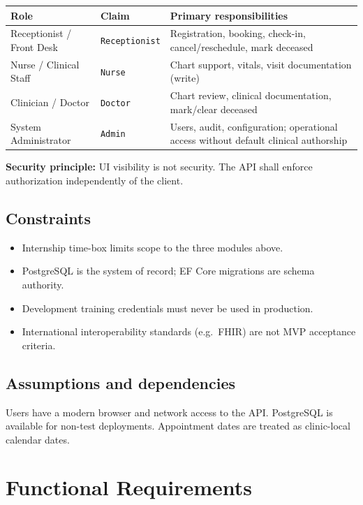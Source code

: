 \documentclass[11pt,a4paper]{article}
\begin{document}
\begin{tabularx}{\textwidth}{@{}p{3.4cm}p{2.4cm}X@{}}
\toprule
\textbf{Role} & \textbf{Claim} & \textbf{Primary responsibilities} \\
\midrule
Receptionist / Front Desk & \texttt{Receptionist} & Registration, booking, check-in, cancel/reschedule, mark deceased \\
Nurse / Clinical Staff & \texttt{Nurse} & Chart support, vitals, visit documentation (write) \\
Clinician / Doctor & \texttt{Doctor} & Chart review, clinical documentation, mark/clear deceased \\
System Administrator & \texttt{Admin} & Users, audit, configuration; operational access without default clinical authorship \\
\bottomrule
\end{tabularx}

\vspace{0.4em}
\noindent\textbf{Security principle:} UI visibility is not security. The API shall enforce authorization independently of the client.

\subsection{Constraints}
\begin{itemize}
  \item Internship time-box limits scope to the three modules above.
  \item PostgreSQL is the system of record; EF Core migrations are schema authority.
  \item Development training credentials must never be used in production.
  \item International interoperability standards (e.g.\ FHIR) are not MVP acceptance criteria.
\end{itemize}

\subsection{Assumptions and dependencies}
Users have a modern browser and network access to the API. PostgreSQL is available for non-test deployments. Appointment dates are treated as clinic-local calendar dates.

\section{Functional Requirements}
\end{document}

